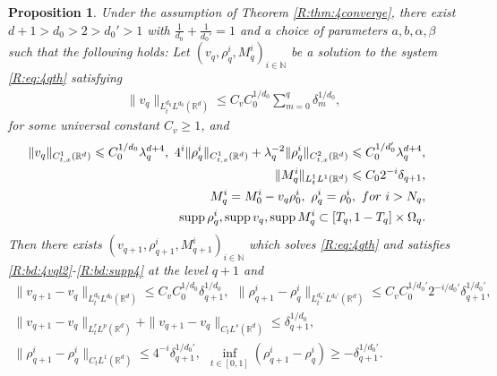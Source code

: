 \documentclass[10pt,a4paper]{amsart}
\numberwithin{equation}{section}
\newtheorem{proposition}[theorem]{Proposition}
\DeclareMathOperator{\supp}{supp}
\def\mN{{\mathbb N}}
\def\geq{\geqslant}
\def\leq{\leqslant}
\def\bp{\begin{proposition}}
\def\ep{\end{proposition}}
\def\geq{\geqslant}
\def\leq{\leqslant}
\begin{document}
\bp\label{R:prop:case4} 
Under the assumption of Theorem \ref{R:thm:4converge}, there exist $d+1>d_0>2>d_0'>1$ with $\frac{1}{d_0}+\frac{1}{d_0'}=1$ and a choice of parameters $a,b,\alpha,\beta$  such
that the following holds: Let $(v_q,\rho^{i}_q,  M^{i}_q)_{i\in\mN}$ be a solution to the system \eqref{R:eq:4qth} satisfying   
\begin{align}\label{R:bd:4vql2}
\|v_q\|_{L^{d_0}_tL^{d_0}(\mathbb{R}^d)}\leq C_vC_0^{1/d_0}\sum_{m=0}^q\delta_{m}^{1/d_0},
\end{align}
for some universal constant $C_v\geq1$, and
\begin{align}
\|v_q\|_{C_{t,x}^1(\mathbb{R}^d)}\leq C_0^{1/d_0}\lambda_q^{d+4},\
4^{i} \|\rho^{i}_{q}\|_{C_{t,x}^1(\mathbb{R}^d)}+\lambda_q^{-2}\|\rho^{i}_{q}\|_{C_{t,x}^2(\mathbb{R}^d)}\leq C_0^{1/d_0'}\lambda_q^{d+4},
\label{R:bd:4rhoqc1}\\
 \|M^{i}_q\|_{L^1_tL^1(\mathbb{R}^d)}\leq C_02^{-i}\delta_{q+1},&\label{R:bd:4rql1}\\
 M^{i}_{q}=M^{i}_{0}-v_{q}\rho^{i}_0,\ \rho_q^{i}=\rho_0^{i}, \ {\rm for\ }  i>N_{q},\label{R:bd:4mqi>nq}\\
  \supp\rho_q^i,\supp v_q,\supp M_q^i\subset [T_q,1-T_q]\times \Omega_q.&\label{R:bd:supp4}
\end{align}
Then there exists 
$(v_{q+1},\rho^{i}_{q+1},  M^{i}_{q+1})_{i\in\mN}$ which solves \eqref{R:eq:4qth} and satisfies \eqref{R:bd:4vql2}-\eqref{R:bd:supp4} at the level $q+1$ and
\begin{align}
\|v_{q+1}-v_{q}\|_{L^{d_0}_tL^{d_0}(\mathbb{R}^d)}\leq
C_vC_0^{1/d_0}\delta_{q+1}^{1/d_0},\label{R:bd:4vq+1-vqldd}\ \
\|\rho^{i}_{q+1}-\rho^{i}_{q}\|_{L^{d_0'}_tL^{d_0'}(\mathbb{R}^d)}\leq
C_v C_0^{1/{d_0'}}2^{-i/d_0'}\delta_{q+1}^{1/{d_0'}},\\%
\|v_{q+1}-v_{q}\|_{L^{r}_tL^{p}(\mathbb{R}^d)}+\|v_{q+1}-v_q\|_{C_tL^s(\mathbb{R}^d)}\leq
\delta_{q+1}^{1/d_0},\label{R:bd:4vq+1-vqlpr}\\
\|\rho^{i}_{q+1}-\rho^{i}_{q}\|_{C_tL^1(\mathbb{R}^d)}\leq
 4^{-i}\delta_{q+1}^{1/d_0'},\ \  \inf_{t\in [0,1]}(\rho^{i}_{q+1} - \rho^{i}_q)\geq - \delta_{q+1}^{1/d_0'} .\label{R:bd:4rhoq+1-rhoql1}
\end{align}
\ep
 
\end{document}
